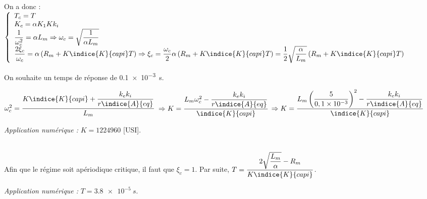 \begin{corrige}
On a donc : 
$
\left\{
\begin{array}{l}
T_c = T \\
K_c = \alpha K_1 Kk_i  \\
\dfrac{1}{\omega_c^2} = \alpha L_m \Rightarrow  \omega_c = \sqrt{\dfrac{1}{\alpha L_m}} \\
\dfrac{2 \xi_c}{\omega_c} = \alpha\left(R_m+  K\indice{K}{capi}T\right) 
\Rightarrow  \xi_c = \dfrac{\omega_c}{2}\alpha\left(R_m+  K\indice{K}{capi}T\right) = \dfrac{1}{2}\sqrt{\dfrac{\alpha}{ L_m}} \left(R_m+  K\indice{K}{capi}T\right)  \\
\end{array}
\right.
$
\end{corrige}\else\fi


\ifprof\begin{corrige}
On souhaite un temps de réponse de \SI{0,1e-3}{s}. 

$\omega_c^2  = \dfrac{K\indice{K}{capi}+\dfrac{k_e k_i}{r\indice{A}{eq}}}{L_m} $
$\Rightarrow K = \dfrac{L_m\omega_c^2 - \dfrac{k_e k_i}{r\indice{A}{eq}}}{\indice{K}{capi}}$
$\Rightarrow K = \dfrac{L_m\left(\dfrac{5}{0,1 \times 10^{-3}} \right)^2 - \dfrac{k_e k_i}{r\indice{A}{eq}}}{\indice{K}{capi}}$

\textit{Application numérique : } $K=1224960$ [USI].
\end{corrige}\else\fi


\ifprof\begin{corrige}~\\
Afin que le régime soit apériodique critique, il faut que $\xi_c = 1$. 
Par suite, $    T = \dfrac{2\sqrt{\dfrac{ L_m}{\alpha}} - R_m }{K\indice{K}{capi}} $.

\textit{Application numérique : } $T=\SI{3,8e-5}{s}$.
\end{corrige}\else\fi

